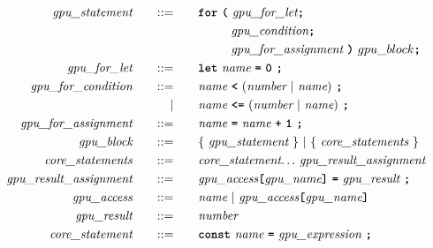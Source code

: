 \begin{alignat*}{9}
    && \textit{gpu\_statement} 
    &&\quad ::= &\quad 
    && \textbf{\texttt{for}}\ \textbf{\texttt{(}} 
                              \ \textit{gpu\_for\_let} \textbf{\texttt{;}} \\
    &&  &&     &\quad && \ \ \ \ \ \ \ \  \textit{gpu\_condition} \textbf{\texttt{;}} \\
    &&  &&     &\quad && \ \ \ \ \ \ \ \  \textit{gpu\_for\_assignment} \ \textbf{\texttt{)}}  \ gpu\_block \textbf{\texttt{;}} \\
    && \textit{gpu\_for\_let} 
    &&\quad ::= &\quad 
    && \textbf{\texttt{let}}\  \textit{name} \ 
                                               \textbf{\texttt{=}}\  \textbf{\texttt{0}} \ \textbf{\texttt{;}} \\
    && \textit{gpu\_for\_condition} 
    &&\quad ::= &\quad 
    && \textit{name} \ 
    \textbf{\texttt{<}}\  (\textit{number} \ | \ \textit{name})\ \textbf{\texttt{;}} \\
    &&  && |    &\quad && \textit{name} \ \textbf{\texttt{<=}}\  (\textit{number} \ | \ \textit{name})\ \textbf{\texttt{;}} \\
    && \textit{gpu\_for\_assignment} 
    &&\quad ::= &\quad 
    && \textit{name} \ \textbf{\texttt{=}}\  \textit{name} \  \textbf{\texttt{+}} \ \textbf{\texttt{1}} \  \textbf{\texttt{;}} \\
    && \textit{gpu\_block} 
    &&\quad ::= &\quad 
    && \{ \ \textit{gpu\_statement} \ \} \ | \ \{ \ \textit{core\_statements} \ \} \\
    && \textit{core\_statements} 
    &&\quad ::= &\quad 
    && \textit{core\_statement} {\ldots} \ \textit{gpu\_result\_assignment} \\
    && \textit{gpu\_result\_assignment} 
    &&\quad ::= &\quad 
    && \textit{gpu\_access} \textbf{\texttt{[}} \textit{gpu\_name} \textbf{\texttt{]}}\ \textbf{\texttt{=}}\  \textit{gpu\_result} \ \textbf{\texttt{;}} \\
    && \textit{gpu\_access} 
    &&\quad ::= &\quad && \textit{name} \ | \
    \textit{gpu\_access} \textbf{\texttt{[}} \textit{gpu\_name} \textbf{\texttt{]}}\ \\
    && \textit{gpu\_result} 
    &&\quad ::= &\quad && \textit{number} \\
    && \textit{core\_statement} 
    &&\quad ::= &\quad 
    && \textbf{\texttt{const}}\  \textit{name} \ 
        \textbf{\texttt{=}}\  \textit{gpu\_expression} \ \textbf{\texttt{;}} \\

\end{alignat*}
